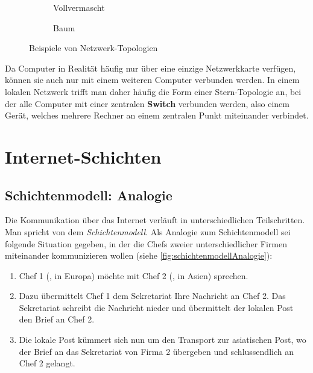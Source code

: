 \begin{figure}[H]
\begin{subfigure}[b]{0.25\textwidth}
		\caption{Vollvermascht}
	\end{subfigure}
	\begin{subfigure}{.25\textwidth}
		\centering
		\caption{Baum}
	\end{subfigure}
	\caption{Beispiele von Netzwerk-Topologien}
	\label{fig:topologie}
\end{figure}

Da Computer in Realität häufig nur über eine einzige Netzwerkkarte verfügen, können sie auch nur mit einem weiteren Computer verbunden werden. In einem lokalen Netzwerk trifft man daher häufig die Form einer Stern-Topologie an, bei der alle Computer mit einer zentralen \textbf{Switch} verbunden werden, also einem Gerät, welches mehrere Rechner an einem zentralen Punkt miteinander verbindet.

\newpage
\section{Internet-Schichten}
\subsection{Schichtenmodell: Analogie}
Die Kommunikation über das Internet verläuft in unterschiedlichen Teilschritten. Man spricht von dem \textit{Schichtenmodell}. Als Analogie zum Schichtenmodell sei folgende Situation gegeben, in der die Chefs zweier unterschiedlicher Firmen miteinander kommunizieren wollen (siehe \cref{fig:schichtenmodellAnalogie}):
\begin{enumerate}
	\item Chef 1 (\faFemale, in Europa) möchte mit Chef 2 (\faMale, in Asien) sprechen.
	\item Dazu übermittelt Chef 1 dem Sekretariat Ihre Nachricht an Chef 2. Das Sekretariat schreibt die Nachricht nieder und übermittelt der lokalen Post den Brief an Chef 2.
	\item Die lokale Post kümmert sich nun um den Transport zur asiatischen Post, wo der Brief an das Sekretariat von Firma 2 übergeben und schlussendlich an Chef 2 gelangt.
\end{enumerate}

